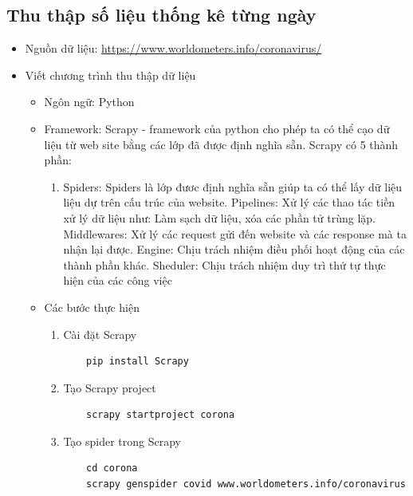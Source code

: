 \documentclass[a4paper, 12pt]{article}
\begin{document}
    \subsection{Thu thập số liệu thống kê từng ngày}

    \begin{itemize}
        \item Nguồn dữ liệu: \url{https://www.worldometers.info/coronavirus/}
        \item Viết chương trình thu thập dữ liệu
        \begin{itemize}
            \item Ngôn ngữ: Python
            \item Framework: Scrapy - framework của python cho phép ta có thể cạo dữ liệu từ web site bằng các lớp đã được định nghĩa sẵn. Scrapy có 5 thành phần:
            \begin{enumerate}
                \item Spiders: Spiders là lớp đươc định nghĩa sẵn giúp ta có thể lấy dữ liệu liệu dự trên cấu trúc của website.
                Pipelines: Xử lý các thao tác tiền xử lý dữ liệu như: Làm sạch dữ liệu, xóa các phần tử trùng lặp.
                Middlewares: Xử lý các request gửi đến website và các response mà ta nhận lại được.
                Engine: Chịu trách nhiệm điều phối hoạt động của các thành phần khác.
                Sheduler: Chịu trách nhiệm duy trì thứ tự thực hiện của các công việc
            \end{enumerate}

            \item Các bước thực hiện
            \begin{enumerate}
                \item Cài đặt Scrapy
                \begin{verbatim}
    pip install Scrapy
                \end{verbatim}

                \item Tạo Scrapy project
                \begin{verbatim}
    scrapy startproject corona
                \end{verbatim}

                \item Tạo spider trong Scrapy
                \begin{verbatim}
    cd corona
    scrapy genspider covid www.worldometers.info/coronavirus
                \end{verbatim}


\end{enumerate}
\end{itemize}
\end{itemize}
\end{document}
